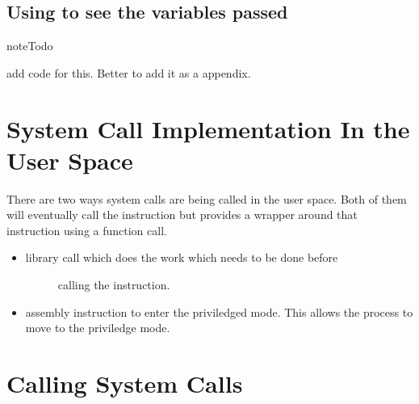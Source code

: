 \documentclass[letterpaper,10pt,english]{sphinxmanual}
\begin{document}
\section{Using  to see the variables passed}
\label{\detokenize{06_setting_up_arguements:using-ptrace-to-see-the-variables-passed}}
\begin{sphinxadmonition}{note}{Todo}

add code for this. Better to add it as a appendix.
\end{sphinxadmonition}


\chapter{System Call Implementation In the User Space}
\label{\detokenize{06_system_call_implementation:system-call-implementation-in-the-user-space}}\label{\detokenize{06_system_call_implementation::doc}}
There are two ways system calls are being called in the user space. Both of
them will eventually call the  instruction but  provides a
wrapper around that instruction using a function call.
\begin{itemize}
\item {} \begin{description}
\item[{ library call which does the work which needs to be done before}] \leavevmode
calling the  instruction.

\end{description}

\item {} 
 assembly instruction to enter the priviledged mode. This allows
the process to move to the priviledge mode.

\end{itemize}


\chapter{Calling System Calls}
\label{\detokenize{07_calling_system_calls:calling-system-calls}}\label{\detokenize{07_calling_system_calls::doc}}
\end{document}
